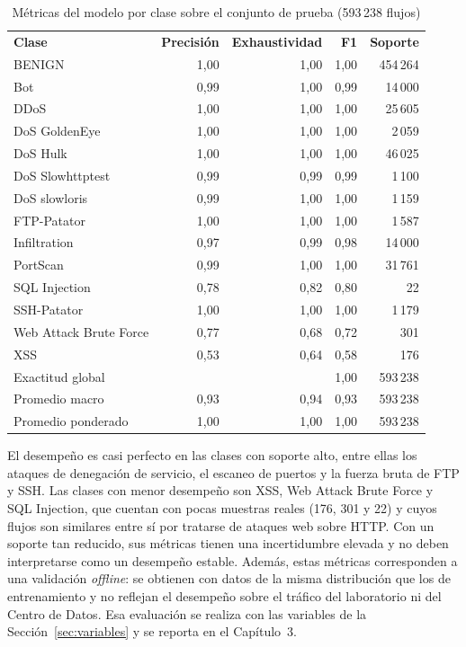 \begin{table}[H]
\centering
\footnotesize
\renewcommand{\arraystretch}{1.1}
\caption{{\fontsize{11pt}{13}\selectfont Métricas del modelo por clase sobre el conjunto de prueba (593\,238 flujos)}}
\label{tbl:metricasClase}
\begin{tabular}{@{}L{5.2cm}rrrr@{}}
\textbf{Clase} & \textbf{Precisión} & \textbf{Exhaustividad} & \textbf{F1} & \textbf{Soporte} \\
BENIGN & 1,00 & 1,00 & 1,00 & 454\,264 \\
Bot & 0,99 & 1,00 & 0,99 & 14\,000 \\
DDoS & 1,00 & 1,00 & 1,00 & 25\,605 \\
DoS GoldenEye & 1,00 & 1,00 & 1,00 & 2\,059 \\
DoS Hulk & 1,00 & 1,00 & 1,00 & 46\,025 \\
DoS Slowhttptest & 0,99 & 0,99 & 0,99 & 1\,100 \\
DoS slowloris & 0,99 & 1,00 & 1,00 & 1\,159 \\
FTP-Patator & 1,00 & 1,00 & 1,00 & 1\,587 \\
Infiltration & 0,97 & 0,99 & 0,98 & 14\,000 \\
PortScan & 0,99 & 1,00 & 1,00 & 31\,761 \\
SQL Injection & 0,78 & 0,82 & 0,80 & 22 \\
SSH-Patator & 1,00 & 1,00 & 1,00 & 1\,179 \\
Web Attack Brute Force & 0,77 & 0,68 & 0,72 & 301 \\
XSS & 0,53 & 0,64 & 0,58 & 176 \\
\addlinespace[0.5ex]
Exactitud global & & & 1,00 & 593\,238 \\
Promedio macro & 0,93 & 0,94 & 0,93 & 593\,238 \\
Promedio ponderado & 1,00 & 1,00 & 1,00 & 593\,238 \\
\end{tabular}
\end{table}

El desempeño es casi perfecto en las clases con soporte alto, entre ellas los ataques de denegación de servicio, el escaneo de puertos y la fuerza bruta de FTP y SSH. Las clases con menor desempeño son XSS, Web Attack Brute Force y SQL Injection, que cuentan con pocas muestras reales (176, 301 y 22) y cuyos flujos son similares entre sí por tratarse de ataques web sobre HTTP. Con un soporte tan reducido, sus métricas tienen una incertidumbre elevada y no deben interpretarse como un desempeño estable. Además, estas métricas corresponden a una validación \emph{offline}: se obtienen con datos de la misma distribución que los de entrenamiento y no reflejan el desempeño sobre el tráfico del laboratorio ni del Centro de Datos. Esa evaluación se realiza con las variables de la Sección~\ref{sec:variables} y se reporta en el Capítulo~3.

